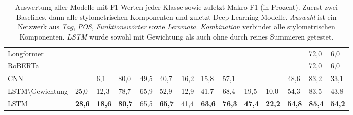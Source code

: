 \documentclass[bachelor,german]{info1thesis}
\begin{document}
\begin{table}[h!]
{\begin{tabular}{@{}llllllllllllll@{}}
\\
Longformer  &      &      &      &      &      &      &      &      &      &      &      & 72,0 & 6,0   \\
RoBERTa  &      &      &      &      &      &      &      &      &      &      &      & 72,0 & 6,0   \\
CNN               &      & 6,1  & 80,0 & 49,5 & 40,7 & 16,2 & 15,8 & 57,1 &      &      & 48,6 & 83,2 & 33,1  \\
LSTM\textbackslash Gewichtung & 25,0 & 12,3 & 78,7 & 65,9 & 52,9 & 12,9 & 41,7 & 68,4 & 19,5 & 10,0 & 54,3 & 83,5 & 43,8  \\
LSTM              & \textbf{28,6} & \textbf{18,6} & \textbf{80,7} & 65,5 & \textbf{65,7} & 41,4 & \textbf{63,6} & \textbf{76,3} & \textbf{47,4} & \textbf{22,2} & \textbf{54,8} & \textbf{85,4} & \textbf{54,2} \\
 \bottomrule
\end{tabular}
}
\caption{Auswertung aller Modelle mit F1-Werten jeder Klasse sowie zuletzt Makro-F1 (in Prozent). Zuerst zwei Baselines, dann alle stylometrischen Komponenten und zuletzt Deep-Learning Modelle. \textit{Auswahl} ist ein Netzwerk aus \textit{Tag}, \textit{POS}, \textit{Funktionswörter} sowie \textit{Lemmata}. \textit{Kombination} verbindet alle stylometrischen Komponenten. \textit{LSTM} wurde sowohl mit Gewichtung als auch ohne durch reines Summieren getestet.}
\label{tab:results}
\end{table}
%
\end{document}
